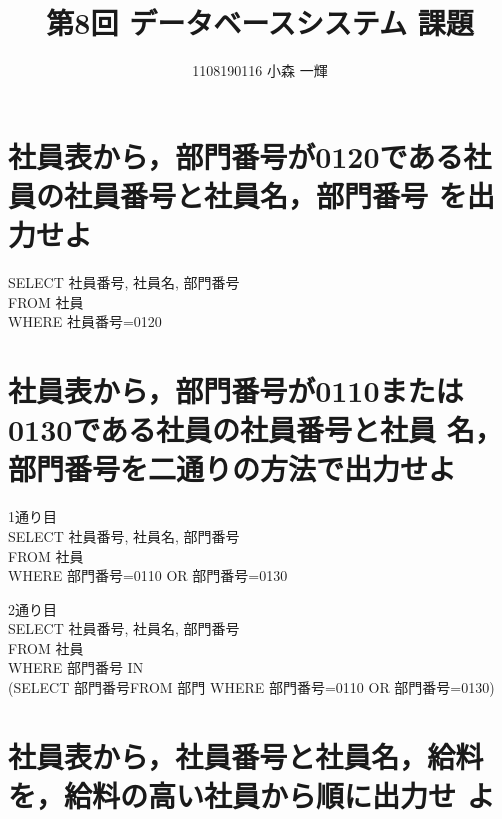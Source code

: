 \documentclass[dvipdfmx,10pt, a4j]{jarticle}
\title{第8回 データベースシステム 課題}
\author{1108190116\; 小森 一輝}
\theoremstyle{definition}
\begin{document}
\maketitle

\setcounter{section}{0}
\setcounter{subsection}{0}

\noindent
\section{社員表から，部門番号が0120である社員の社員番号と社員名，部門番号
  を出力せよ}

\begin{flushleft}
    SELECT\; 社員番号, 社員名, 部門番号\\
    FROM 社員\\
    WHERE 社員番号=0120\\
\end{flushleft}
\noindent
\section{社員表から，部門番号が0110または0130である社員の社員番号と社員
  名，部門番号を二通りの方法で出力せよ}

\begin{flushleft}1通り目\\
    SELECT 社員番号, 社員名, 部門番号\\
    FROM 社員\\
    WHERE 部門番号=0110 OR 部門番号=0130\\
\end{flushleft}

\begin{flushleft}2通り目\\
    SELECT 社員番号, 社員名, 部門番号\\
    FROM 社員\\
    WHERE 部門番号 IN \\
    (SELECT 部門番号FROM 部門 WHERE 部門番号=0110 OR 部門番号=0130)\\
\end{flushleft}

\noindent
\section{社員表から，社員番号と社員名，給料を，給料の高い社員から順に出力せ
  よ}
\end{document}
